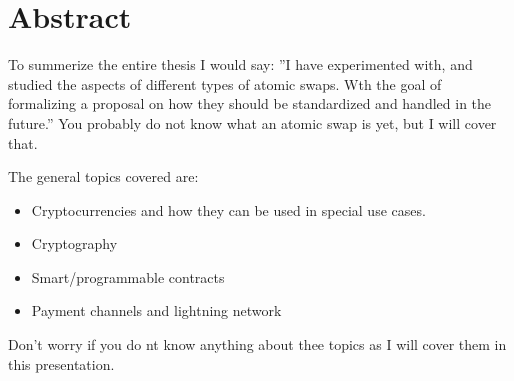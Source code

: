 \chapter{Abstract}
To summerize the entire thesis I would say: ''I have experimented with, and studied the aspects of different types of atomic swaps. Wth the goal of formalizing a proposal on how they should be standardized and handled in the future.'' You probably do not know what an atomic swap is yet, but I will cover that.

The general topics covered are:
\begin{itemize}
\item Cryptocurrencies and how they can be used in special use cases.
\item Cryptography
\item Smart/programmable contracts
\item Payment channels and lightning network
\end{itemize}

Don't worry if you do nt know anything about thee topics as I will cover them in this presentation. 